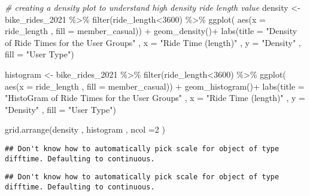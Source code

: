 \documentclass[
]{article}
\newenvironment{Shaded}{\begin{snugshade}}{\end{snugshade}}
\newcommand{\AttributeTok}[1]{\textcolor[rgb]{0.77,0.63,0.00}{#1}}
\newcommand{\CommentTok}[1]{\textcolor[rgb]{0.56,0.35,0.01}{\textit{#1}}}
\newcommand{\DecValTok}[1]{\textcolor[rgb]{0.00,0.00,0.81}{#1}}
\newcommand{\FunctionTok}[1]{\textcolor[rgb]{0.00,0.00,0.00}{#1}}
\newcommand{\NormalTok}[1]{#1}
\newcommand{\OtherTok}[1]{\textcolor[rgb]{0.56,0.35,0.01}{#1}}
\newcommand{\SpecialCharTok}[1]{\textcolor[rgb]{0.00,0.00,0.00}{#1}}
\newcommand{\StringTok}[1]{\textcolor[rgb]{0.31,0.60,0.02}{#1}}
\begin{document}
\begin{Shaded}
\begin{Highlighting}[]
\CommentTok{\# creating a density plot to understand high density ride length value  }
\NormalTok{density }\OtherTok{\textless{}{-}}\NormalTok{ bike\_rides\_2021 }\SpecialCharTok{\%\textgreater{}\%} \FunctionTok{filter}\NormalTok{(ride\_length}\SpecialCharTok{\textless{}}\DecValTok{3600}\NormalTok{)  }\SpecialCharTok{\%\textgreater{}\%}
  \FunctionTok{ggplot}\NormalTok{( }\FunctionTok{aes}\NormalTok{(}\AttributeTok{x =}\NormalTok{ ride\_length , }\AttributeTok{fill =}\NormalTok{ member\_casual)) }\SpecialCharTok{+}
  \FunctionTok{geom\_density}\NormalTok{()}\SpecialCharTok{+}
  \FunctionTok{labs}\NormalTok{(}\AttributeTok{title =} \StringTok{"Density of  Ride Times for the User Groups"}\NormalTok{  , }\AttributeTok{x =} \StringTok{"Ride Time (length)"}\NormalTok{ , }\AttributeTok{y =} \StringTok{"Density"}\NormalTok{ , }\AttributeTok{fill =} \StringTok{"User Type"}\NormalTok{)}

\NormalTok{histogram }\OtherTok{\textless{}{-}}\NormalTok{ bike\_rides\_2021 }\SpecialCharTok{\%\textgreater{}\%} \FunctionTok{filter}\NormalTok{(ride\_length}\SpecialCharTok{\textless{}}\DecValTok{3600}\NormalTok{)  }\SpecialCharTok{\%\textgreater{}\%}
  \FunctionTok{ggplot}\NormalTok{( }\FunctionTok{aes}\NormalTok{(}\AttributeTok{x =}\NormalTok{ ride\_length , }\AttributeTok{fill =}\NormalTok{ member\_casual)) }\SpecialCharTok{+}
  \FunctionTok{geom\_histogram}\NormalTok{()}\SpecialCharTok{+}
  \FunctionTok{labs}\NormalTok{(}\AttributeTok{title =} \StringTok{"HistoGram of  Ride Times for the User Groups"}\NormalTok{  , }\AttributeTok{x =} \StringTok{"Ride Time (length)"}\NormalTok{ , }\AttributeTok{y =} \StringTok{"Density"}\NormalTok{ , }\AttributeTok{fill =} \StringTok{"User Type"}\NormalTok{)}

\FunctionTok{grid.arrange}\NormalTok{(density , histogram , }\AttributeTok{ncol =}\DecValTok{2}\NormalTok{ )}
\end{Highlighting}
\end{Shaded}

\begin{verbatim}
## Don't know how to automatically pick scale for object of type difftime. Defaulting to continuous.
\end{verbatim}

\begin{verbatim}
## Don't know how to automatically pick scale for object of type difftime. Defaulting to continuous.
\end{verbatim}
\end{document}
